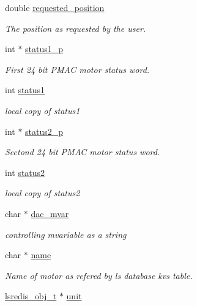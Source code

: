 \begin{DoxyCompactItemize}
double \hyperlink{structlspmac__motor__struct_af8cdc94c6e2478b12ce942d4cf1d7499}{requested\-\_\-position}
\begin{DoxyCompactList}\small\item\em The position as requested by the user. \end{DoxyCompactList}\item 
int $\ast$ \hyperlink{structlspmac__motor__struct_a56c41875faf19c643e97c10519e6eb8c}{status1\-\_\-p}
\begin{DoxyCompactList}\small\item\em First 24 bit P\-M\-A\-C motor status word. \end{DoxyCompactList}\item 
int \hyperlink{structlspmac__motor__struct_acb52b612b9237e8eec0b97fb1e76a35d}{status1}
\begin{DoxyCompactList}\small\item\em local copy of status1 \end{DoxyCompactList}\item 
int $\ast$ \hyperlink{structlspmac__motor__struct_a2b33ef6e12717459c1e9967cc6e659c6}{status2\-\_\-p}
\begin{DoxyCompactList}\small\item\em Sectond 24 bit P\-M\-A\-C motor status word. \end{DoxyCompactList}\item 
int \hyperlink{structlspmac__motor__struct_a6a412224c09268c1dc92de9c2a1a2512}{status2}
\begin{DoxyCompactList}\small\item\em local copy of status2 \end{DoxyCompactList}\item 
char $\ast$ \hyperlink{structlspmac__motor__struct_a05dff021221abbc1bf656039fffb3275}{dac\-\_\-mvar}
\begin{DoxyCompactList}\small\item\em controlling mvariable as a string \end{DoxyCompactList}\item 
char $\ast$ \hyperlink{structlspmac__motor__struct_aa90af2f6f1489f1befe1d0891e51575a}{name}
\begin{DoxyCompactList}\small\item\em Name of motor as refered by ls database kvs table. \end{DoxyCompactList}\item 
\hyperlink{pgpmac_8h_ad449de06d02791adf2498d2a1e1f909c}{lsredis\-\_\-obj\-\_\-t} $\ast$ \hyperlink{structlspmac__motor__struct_af8e6eb1df6b0d343fc4da93fbdd63133}{unit}

\end{DoxyCompactItemize}
